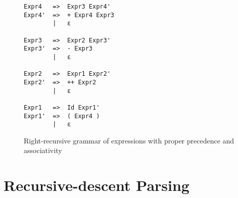 \documentclass[hidelinks]{uva-inf-article}
\begin{document}
\begin{flushleft}
\begin{figure}[h]
\begin{lstlisting}
Expr4   =>  Expr3 Expr4'
Expr4'  =>  + Expr4 Expr3
        |   ε

Expr3   =>  Expr2 Expr3'
Expr3'  =>  - Expr3
        |   ε

Expr2   =>  Expr1 Expr2'
Expr2'  =>  ++ Expr2
        |   ε

Expr1   =>  Id Expr1'
Expr1'  =>  ( Expr4 )
        |   ε
\end{lstlisting}
\caption{Right-recursive grammar of expressions with proper precedence and associativity}
\label{fig:3}
\end{figure}
\newpage
\section{Recursive-descent Parsing}

\end{flushleft}
\end{document}
